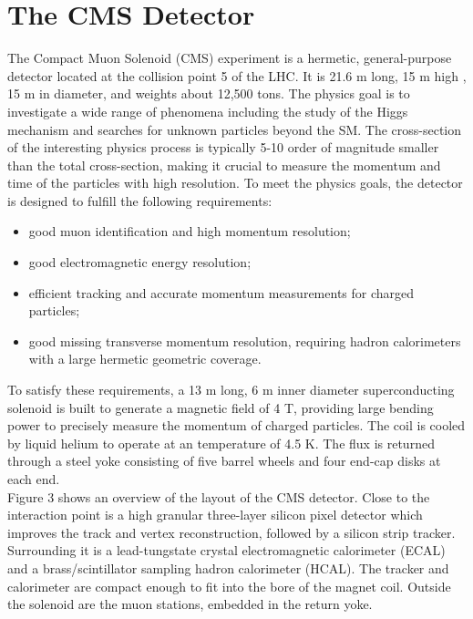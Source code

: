 \documentclass[thesis.tex]{subfiles}
\begin{document}
\section{The CMS Detector}

The Compact Muon Solenoid (CMS) experiment is a hermetic, general-purpose detector located at the collision point 5 of the LHC.  It is 21.6 m long, 15 m high , 15 m in diameter, and weights about 12,500 tons. The physics goal is to investigate a wide range of phenomena including the study of the Higgs mechanism and searches for unknown particles beyond the SM. The cross-section of the interesting physics process is typically 5-10 order of magnitude smaller than the total cross-section, making it crucial to measure the momentum and time of the particles with high resolution. To meet the physics goals, the detector is designed to fulfill the following requirements:   
\begin{itemize}
\item good muon identification and high momentum resolution;
\item good electromagnetic energy resolution;
\item efficient tracking and accurate momentum measurements for charged particles;
\item good missing transverse momentum resolution, requiring hadron calorimeters with a large hermetic geometric coverage. 
\end{itemize}

To satisfy these requirements, a 13 m long, 6 m inner diameter superconducting solenoid is built to generate a magnetic field of 4 T, providing large bending power to precisely measure the momentum of charged particles. The coil is cooled by liquid helium to operate at an temperature of 4.5 K. The flux is returned through a steel yoke consisting of five barrel wheels and four end-cap disks at each end. \\

Figure 3 shows an overview of the layout of the CMS detector. Close to the interaction point is a high granular three-layer silicon pixel detector which improves the track and vertex reconstruction, followed by a silicon strip tracker. Surrounding it is a lead-tungstate crystal electromagnetic calorimeter (ECAL) and a brass/scintillator sampling hadron calorimeter (HCAL). The tracker and calorimeter are compact enough to fit into the bore of the magnet coil. Outside the solenoid are the muon stations, embedded in the return yoke. \\
\end{document}
